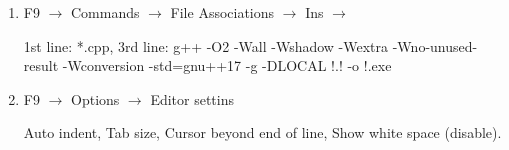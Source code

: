 \begin{enumerate}
    \item
	F9 $\rightarrow$ Commands $\rightarrow$ File Associations $\rightarrow$ Ins $\rightarrow$

	1st line: *.cpp, 3rd line: g++ -O2 -Wall -Wshadow -Wextra -Wno-unused-result -Wconversion -std=gnu++17 -g -DLOCAL !.! -o !.exe
	
	\item
	F9 $\rightarrow$ Options $\rightarrow$ Editor settins
	
	Auto indent, Tab size, Cursor beyond end of line, Show white space (disable).
\end{enumerate}
